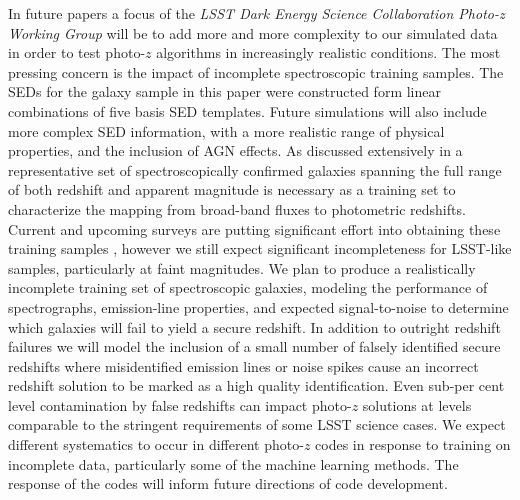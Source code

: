 In future papers a focus of the {\it LSST Dark Energy Science Collaboration Photo-z Working Group} will be to add more and more complexity to our simulated data in order to test photo-$z$ algorithms in increasingly realistic conditions.  The most pressing concern is the impact of incomplete spectroscopic training samples.  The SEDs for the galaxy sample in this paper were constructed form linear combinations of five basis SED templates.  Future simulations will also include more complex SED information, with a more realistic range of physical properties, and the inclusion of AGN effects.  As discussed extensively in \citet{Newman:2015} a representative set of spectroscopically confirmed galaxies spanning the full range of both redshift and apparent magnitude is necessary as a training set to characterize the mapping from broad-band fluxes to photometric redshifts.
Current and upcoming surveys are putting significant effort into obtaining these training samples \citep[e.~g.\,][]{Masters:2017}, however we still expect significant incompleteness for LSST-like samples, particularly at faint magnitudes.  We plan to produce a realistically incomplete training set of spectroscopic galaxies, modeling the performance of spectrographs, emission-line properties, and expected signal-to-noise to determine which galaxies will fail to yield a secure redshift.  In addition to outright redshift failures we will model the inclusion of a small number of falsely identified secure redshifts where misidentified emission lines or noise spikes cause an incorrect redshift solution to be marked as a high quality identification.  Even sub-per cent level contamination by false redshifts can impact photo-$z$ solutions at levels comparable to the stringent  requirements of some LSST science cases.
We expect different systematics to occur in different photo-$z$ codes in response to training on incomplete data, particularly some of the machine learning methods.  The response of the codes will inform future directions of code development.


